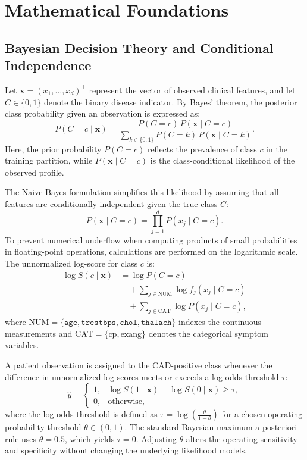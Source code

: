 \documentclass[conference]{IEEEtran}
\begin{document}
\section{Mathematical Foundations}

\subsection{Bayesian Decision Theory and Conditional Independence}
Let $\mathbf{x}=(x_1,\ldots,x_d)^\top$ represent the vector of observed clinical features, and let $C\in\{0,1\}$ denote the binary disease indicator. By Bayes' theorem, the posterior class probability given an observation is expressed as:
\begin{equation}
P(C=c\mid\mathbf{x})
=\frac{P(C=c)\,P(\mathbf{x}\mid C=c)}
{\sum_{k\in\{0,1\}} P(C=k)\,P(\mathbf{x}\mid C=k)}.
\end{equation}
Here, the prior probability $P(C=c)$ reflects the prevalence of class $c$ in the training partition, while $P(\mathbf{x}\mid C=c)$ is the class-conditional likelihood of the observed profile. 

The Naive Bayes formulation simplifies this likelihood by assuming that all features are conditionally independent given the true class $C$:
\begin{equation}
P(\mathbf{x}\mid C=c)=\prod_{j=1}^{d} P(x_j\mid C=c).
\end{equation}
To prevent numerical underflow when computing products of small probabilities in floating-point operations, calculations are performed on the logarithmic scale. The unnormalized log-score for class $c$ is:
\begin{equation}
\begin{aligned}
\log S(c\mid\mathbf{x})
&=\log P(C=c)\\
&\quad+\sum_{j\in\mathrm{NUM}}\log f_j(x_j\mid C=c)\\
&\quad+\sum_{j\in\mathrm{CAT}}\log P(x_j\mid C=c),
\end{aligned}
\end{equation}
where $\mathrm{NUM}=\{\texttt{age},\texttt{trestbps},\texttt{chol},\texttt{thalach}\}$ indexes the continuous measurements and $\mathrm{CAT}=\{\text{cp},\text{exang}\}$ denotes the categorical symptom variables.

A patient observation is assigned to the CAD-positive class whenever the difference in unnormalized log-scores meets or exceeds a log-odds threshold $\tau$:
\begin{equation}
\hat{y}=
\begin{cases}
1, & \log S(1\mid\mathbf{x})-\log S(0\mid\mathbf{x})\ge\tau,\\
0, & \text{otherwise,}
\end{cases}
\end{equation}
where the log-odds threshold is defined as $\tau = \log\left(\frac{\theta}{1-\theta}\right)$ for a chosen operating probability threshold $\theta\in(0,1)$. The standard Bayesian maximum a posteriori rule uses $\theta=0.5$, which yields $\tau=0$. Adjusting $\theta$ alters the operating sensitivity and specificity without changing the underlying likelihood models.
\end{document}
